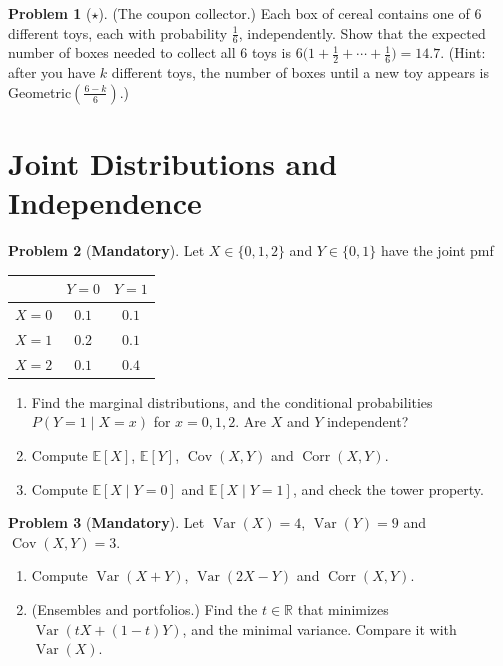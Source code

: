\documentclass[11pt]{article}
\theoremstyle{definition}
\newtheorem{problem}{Problem}[section]
\newcommand{\mandatory}{\textcolor{red!70!black}{\textbf{Mandatory}}}
\newcommand{\E}{\mathbb{E}}
\DeclareMathOperator{\Var}{Var}
\DeclareMathOperator{\Cov}{Cov}
\DeclareMathOperator{\Corr}{Corr}
\begin{document}
\begin{problem}[$\star$]\label{pr:coupons}
    (The coupon collector.) Each box of cereal contains one of $6$ different toys, each with probability $\frac{1}{6}$, independently. Show that the expected number of boxes needed to collect all $6$ toys is $6\big(1 + \frac{1}{2} + \cdots + \frac{1}{6}\big) = 14.7$. (Hint: after you have $k$ different toys, the number of boxes until a new toy appears is Geometric$(\frac{6 - k}{6})$.)
\end{problem}

\section{Joint Distributions and Independence}

\begin{problem}[\mandatory]\label{pr:joint-table}
    Let $X \in \{0, 1, 2\}$ and $Y \in \{0, 1\}$ have the joint pmf
    \begin{center}
        \renewcommand{\arraystretch}{1.2}
        \begin{tabular}{c|cc}
            & $Y = 0$ & $Y = 1$ \\
            \hline
            $X = 0$ & $0.1$ & $0.1$ \\
            $X = 1$ & $0.2$ & $0.1$ \\
            $X = 2$ & $0.1$ & $0.4$
        \end{tabular}
    \end{center}
    \begin{enumerate}[label=(\alph*)]
        \item Find the marginal distributions, and the conditional probabilities $P(Y = 1 \mid X = x)$ for $x = 0, 1, 2$. Are $X$ and $Y$ independent?
        \item Compute $\E[X]$, $\E[Y]$, $\Cov(X, Y)$ and $\Corr(X, Y)$.
        \item Compute $\E[X \mid Y = 0]$ and $\E[X \mid Y = 1]$, and check the tower property.
    \end{enumerate}
\end{problem}

\begin{problem}[\mandatory]\label{pr:portfolio}
    Let $\Var(X) = 4$, $\Var(Y) = 9$ and $\Cov(X, Y) = 3$.
    \begin{enumerate}[label=(\alph*)]
        \item Compute $\Var(X + Y)$, $\Var(2X - Y)$ and $\Corr(X, Y)$.
        \item (Ensembles and portfolios.) Find the $t \in \mathbb{R}$ that minimizes $\Var(tX + (1 - t)Y)$, and the minimal variance. Compare it with $\Var(X)$.
    \end{enumerate}
\end{problem}
\end{document}
